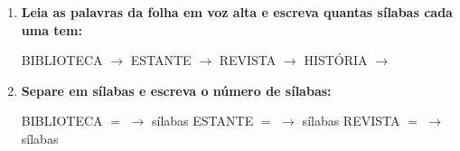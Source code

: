 \begin{exercicio}
\begin{enumerate}[resume]
  \item \textbf{Leia as palavras da folha em voz alta e escreva quantas sílabas cada uma tem:}

  \begin{center}
  BIBLIOTECA $\rightarrow$ \underline{\hspace{1cm}} \quad ESTANTE $\rightarrow$ \underline{\hspace{1cm}} \quad REVISTA $\rightarrow$ \underline{\hspace{1cm}} \quad HISTÓRIA $\rightarrow$ \underline{\hspace{1cm}}
  \end{center}

  \item \textbf{Separe em sílabas e escreva o número de sílabas:}
  \begin{center}
  BIBLIOTECA $=$ \underline{\hspace{1.2cm}} $\rightarrow$ \underline{\hspace{0.8cm}} sílabas \quad ESTANTE $=$ \underline{\hspace{1.2cm}} $\rightarrow$ \underline{\hspace{0.8cm}} sílabas \quad REVISTA $=$ \underline{\hspace{1.2cm}} $\rightarrow$ \underline{\hspace{0.8cm}} sílabas
  \end{center}

\end{enumerate}

\end{exercicio}



